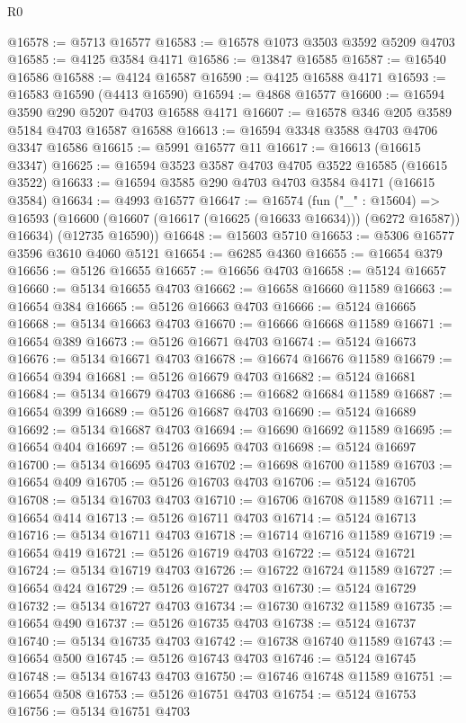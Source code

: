 \begin{lexlean}{R0}
\begin{coremodule}
@16578 := @5713 @16577
@16583 := @16578 @1073 @3503 @3592 @5209 @4703
@16585 := @4125 @3584 @4171
@16586 := @13847 @16585
@16587 := @16540 @16586
@16588 := @4124 @16587
@16590 := @4125 @16588 @4171
@16593 := @16583 @16590 (@4413 @16590)
@16594 := @4868 @16577
@16600 := @16594 @3590 @290 @5207 @4703 @16588 @4171
@16607 := @16578 @346 @205 @3589 @5184 @4703 @16587 @16588
@16613 := @16594 @3348 @3588 @4703 @4706 @3347 @16586
@16615 := @5991 @16577 @11
@16617 := @16613 (@16615 @3347)
@16625 := @16594 @3523 @3587 @4703 @4705 @3522 @16585 (@16615 @3522)
@16633 := @16594 @3585 @290 @4703 @4703 @3584 @4171 (@16615 @3584)
@16634 := @4993 @16577
@16647 := @16574
    (fun ("_" : @15604) =>
    @16593
      (@16600 (@16607 (@16617 (@16625 (@16633 @16634))) (@6272 @16587)) @16634)
      (@12735 @16590))
@16648 := @15603 @5710
@16653 := @5306 @16577 @3596 @3610 @4060 @5121
@16654 := @6285 @4360
@16655 := @16654 @379
@16656 := @5126 @16655
@16657 := @16656 @4703
@16658 := @5124 @16657
@16660 := @5134 @16655 @4703
@16662 := @16658 @16660 @11589
@16663 := @16654 @384
@16665 := @5126 @16663 @4703
@16666 := @5124 @16665
@16668 := @5134 @16663 @4703
@16670 := @16666 @16668 @11589
@16671 := @16654 @389
@16673 := @5126 @16671 @4703
@16674 := @5124 @16673
@16676 := @5134 @16671 @4703
@16678 := @16674 @16676 @11589
@16679 := @16654 @394
@16681 := @5126 @16679 @4703
@16682 := @5124 @16681
@16684 := @5134 @16679 @4703
@16686 := @16682 @16684 @11589
@16687 := @16654 @399
@16689 := @5126 @16687 @4703
@16690 := @5124 @16689
@16692 := @5134 @16687 @4703
@16694 := @16690 @16692 @11589
@16695 := @16654 @404
@16697 := @5126 @16695 @4703
@16698 := @5124 @16697
@16700 := @5134 @16695 @4703
@16702 := @16698 @16700 @11589
@16703 := @16654 @409
@16705 := @5126 @16703 @4703
@16706 := @5124 @16705
@16708 := @5134 @16703 @4703
@16710 := @16706 @16708 @11589
@16711 := @16654 @414
@16713 := @5126 @16711 @4703
@16714 := @5124 @16713
@16716 := @5134 @16711 @4703
@16718 := @16714 @16716 @11589
@16719 := @16654 @419
@16721 := @5126 @16719 @4703
@16722 := @5124 @16721
@16724 := @5134 @16719 @4703
@16726 := @16722 @16724 @11589
@16727 := @16654 @424
@16729 := @5126 @16727 @4703
@16730 := @5124 @16729
@16732 := @5134 @16727 @4703
@16734 := @16730 @16732 @11589
@16735 := @16654 @490
@16737 := @5126 @16735 @4703
@16738 := @5124 @16737
@16740 := @5134 @16735 @4703
@16742 := @16738 @16740 @11589
@16743 := @16654 @500
@16745 := @5126 @16743 @4703
@16746 := @5124 @16745
@16748 := @5134 @16743 @4703
@16750 := @16746 @16748 @11589
@16751 := @16654 @508
@16753 := @5126 @16751 @4703
@16754 := @5124 @16753
@16756 := @5134 @16751 @4703

\end{coremodule}
\end{lexlean}
